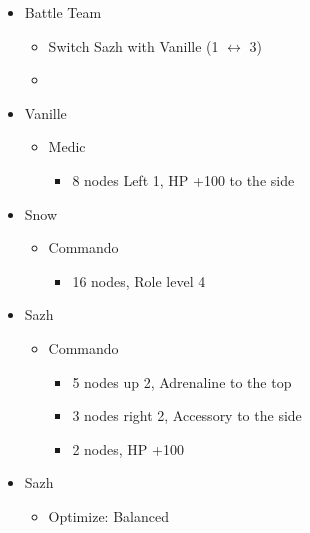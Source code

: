 \begin{multicols}{2}
	\begin{menu}
		\begin{itemize}
			\paradigm
			\begin{itemize}
				\item Battle Team
				      \begin{itemize}
					      \item Switch Sazh with Vanille (1 $\leftrightarrow$ 3)
					      \item {}%
					            {\paradigmline{(\med)}{\com}{(\com)}}%
					            {\paradigmline{(\sab)}{\com}{\com}}%
					            {\paradigmline{(\sab)}{\sen}{(\syn)}}%
					            {\paradigmline{(\rav)}{(\rav)}{(\syn)}}%
					            {\paradigmline[5]{\textit{(\sab)}}{\textit{(\rav)}}{\textit{\rav}}}%
					            {\paradigmline{\rav}{\rav}{\rav}}
				      \end{itemize}
			\end{itemize}
			\crystarium
			\begin{itemize}
				\item Vanille
				      \begin{itemize}
					      \item Medic
					            \begin{itemize}
						            \item 8 nodes Left 1, HP +100 to the side
					            \end{itemize}
				      \end{itemize}
				\item Snow
				      \begin{itemize}
					      \item Commando
					            \begin{itemize}
						            \item 16 nodes, Role level 4
					            \end{itemize}
				      \end{itemize}
				\item Sazh
				      \begin{itemize}
					      \item Commando
					            \begin{itemize}
						            \item 5 nodes up 2, Adrenaline to the top
						            \item 3 nodes right 2, Accessory to the side
						            \item 2 nodes, HP +100
					            \end{itemize}
				      \end{itemize}
			\end{itemize}
			\equip
			\begin{itemize}
				\item Sazh
				      \begin{itemize}
					      \item Optimize: Balanced
				      \end{itemize}
			\end{itemize}
		\end{itemize}
	\end{menu}


\end{multicols}
